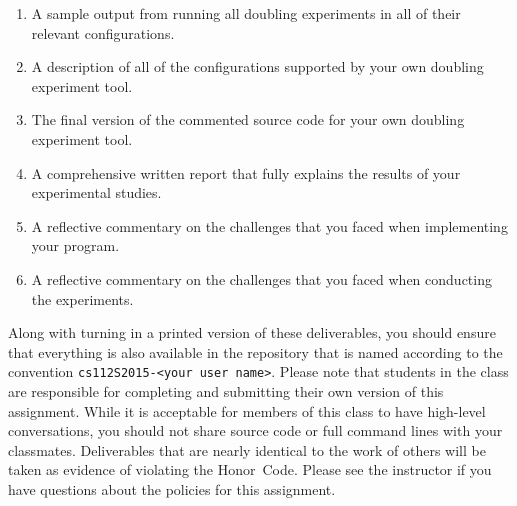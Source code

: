   \begin{enumerate}
  \itemsep0pt

  \item A sample output from running all doubling experiments in all of their relevant configurations.

  \item A description of all of the configurations supported by your own doubling experiment tool.

  \item The final version of the commented source code for your own doubling experiment tool.

  \item A comprehensive written report that fully explains the results of your experimental studies.

  \item A reflective commentary on the challenges that you faced when implementing your program.

  \item A reflective commentary on the challenges that you faced when conducting the experiments.

  \end{enumerate}

  Along with turning in a printed version of these deliverables, you should ensure that everything is also available in
  the repository that is named according to the convention {\tt cs112S2015-<your user name>}. Please note that students
  in the class are responsible for completing and submitting their own version of this assignment.    While it is
  acceptable for members of this class to have high-level conversations, you should not share source code or full
  command lines with your classmates.  Deliverables that are nearly identical to the work of others will be taken as
  evidence of violating the \mbox{Honor Code}.  Please see the instructor if you have questions about the policies for
  this assignment.

  
